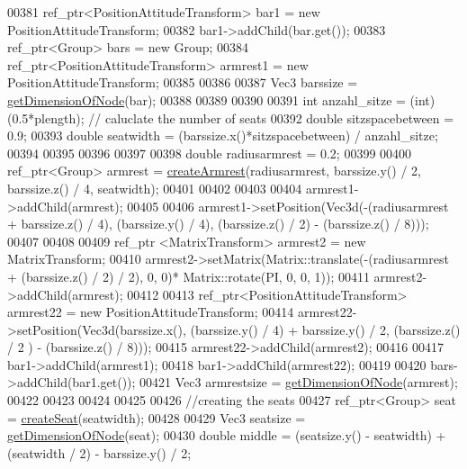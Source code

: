 \begin{DoxyCode}
00381         ref\_ptr<PositionAttitudeTransform> bar1 = \textcolor{keyword}{new} PositionAttitudeTransform;
00382         bar1->addChild(bar.get());
00383         ref\_ptr<Group> bars = \textcolor{keyword}{new} Group;
00384         ref\_ptr<PositionAttitudeTransform> armrest1 = \textcolor{keyword}{new} PositionAttitudeTransform;
00385         
00386         
00387         Vec3 barssize = \hyperlink{namespacebrtr_a24ba7c5d07ad50afb09990116dd3556d}{getDimensionOfNode}(bar);
00388 
00389 
00390       
00391         \textcolor{keywordtype}{int} anzahl\_sitze = (int)(0.5*plength); \textcolor{comment}{// caluclate the number of seats}
00392         \textcolor{keywordtype}{double} sitzspacebetween = 0.9;
00393         \textcolor{keywordtype}{double} seatwidth = (barssize.x()*sitzspacebetween) / anzahl\_sitze;
00394 
00395 
00396 
00397 
00398         \textcolor{keywordtype}{double} radiusarmrest = 0.2;
00399 
00400         ref\_ptr<Group> armrest = \hyperlink{classbrtr_1_1_bench_a9956994e6a20cbbd0f0ce9eb6df25917}{createArmrest}(radiusarmrest, barssize.y() / 2, barssize.z() /
       4, seatwidth);
00401 
00402 
00403 
00404         armrest1->addChild(armrest);
00405         
00406         armrest1->setPosition(Vec3d(-(radiusarmrest + barssize.z() / 4), (barssize.y() / 4), (barssize.z() 
      / 2) - (barssize.z() / 8)));
00407         
00408 
00409         ref\_ptr <MatrixTransform> armrest2 = \textcolor{keyword}{new} MatrixTransform;
00410         armrest2->setMatrix(Matrix::translate(-(radiusarmrest + (barssize.z() / 2) / 2), 0, 0)*
      Matrix::rotate(PI, 0, 0, 1));
00411         armrest2->addChild(armrest);
00412         
00413         ref\_ptr<PositionAttitudeTransform> armrest22 = \textcolor{keyword}{new} PositionAttitudeTransform;
00414         armrest22->setPosition(Vec3d(barssize.x(), (barssize.y() / 4) + barssize.y() / 2, (barssize.z() / 2
      ) - (barssize.z() / 8)));
00415         armrest22->addChild(armrest2);
00416 
00417         bar1->addChild(armrest1);
00418         bar1->addChild(armrest22);
00419 
00420         bars->addChild(bar1.get());
00421         Vec3 armrestsize = \hyperlink{namespacebrtr_a24ba7c5d07ad50afb09990116dd3556d}{getDimensionOfNode}(armrest);
00422 
00423 
00424 
00425 
00426         \textcolor{comment}{//creating the seats}
00427         ref\_ptr<Group> seat = \hyperlink{classbrtr_1_1_bench_a0547e73d10f329b2a9b4453b6319f472}{createSeat}(seatwidth);
00428 
00429         Vec3 seatsize = \hyperlink{namespacebrtr_a24ba7c5d07ad50afb09990116dd3556d}{getDimensionOfNode}(seat);
00430         \textcolor{keywordtype}{double} middle = (seatsize.y() - seatwidth) + (seatwidth / 2) - barssize.y() / 2;

\end{DoxyCode}
